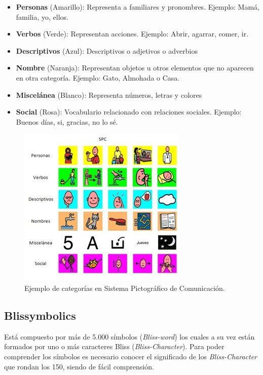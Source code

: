 \begin{itemize}
	\item \textbf{Personas} (Amarillo): Representa a familiares y pronombres. Ejemplo: Mamá, familia,  yo, ellos.
	\item \textbf{Verbos} (Verde): Representan acciones. Ejemplo: Abrir, agarrar, comer, ir.
	\item \textbf{Descriptivos} (Azul): Descriptivos o adjetivos o adverbios
	\item \textbf{Nombre} (Naranja): Representan objetos u otros elementos que no aparecen en otra categoría. Ejemplo: Gato, Almohada o Casa.
	\item \textbf{Miscelánea} (Blanco): Representa números, letras y colores
	\item \textbf{Social} (Rosa): Vocabulario relacionado con relaciones sociales. Ejemplo: Buenos días, si, gracias, no lo sé.
	
\end{itemize}


\begin{figure}[h!]
	\centering
	\includegraphics[width=0.7\linewidth]{Imagenes/Bitmap/SPCcolores}
	\caption{Ejemplo de categorías en Sistema Pictográfico de Comunicación.}
	\label{fig:spccolores}
\end{figure}

\subsection{Blissymbolics}
Está compuesto por más de 5.000 símbolos (\textit{Bliss-word}) los cuales a su vez están formados por uno o más caracteres Bliss (\textit{Bliss-Character}). Para poder comprender los símbolos es necesario conocer el significado de los \textit{Bliss-Character} que rondan los 150, siendo de fácil comprensión.

